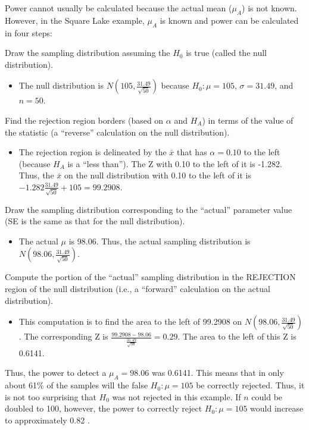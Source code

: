 \documentclass[10pt,openany]{book}\usepackage[]{graphicx}\usepackage[]{color}
\begin{document}
\vspace{12pt}
Power cannot usually be calculated because the actual mean ($\mu_{A}$) is not known.  However, in the Square Lake example, $\mu_{A}$ is known and power can be calculated in four steps:
\begin{Enumerate}
 \item Draw the sampling distribution assuming the $H_{0}$ is true (called the null distribution).
 \begin{itemize}
   \item The null distribution is $N(105,\frac{31.49}{\sqrt{50}})$ because $H_{0}:\mu=105$, $\sigma=31.49$, and $n=50$.
 \end{itemize}
 \item Find the rejection region borders (based on $\alpha$ and $H_{A}$) in terms of the value of the statistic (a ``reverse'' calculation on the null distribution).
 \begin{itemize}
   \item The rejection region is delineated by the $\bar{x}$ that has $\alpha=0.10$ to the left (because $H_{A}$ is a ``less than'').  The Z with 0.10 to the left of it is -1.282.  Thus, the $\bar{x}$ on the null distribution with 0.10 to the left of it is $-1.282\frac{31.49}{\sqrt{50}}+105 = 99.2908$.
 \end{itemize}
 \item Draw the sampling distribution corresponding to the ``actual'' parameter value (SE is the same as that for the null distribution).
 \begin{itemize}
   \item The actual $\mu$ is 98.06.  Thus, the actual sampling distribution is $N(98.06,\frac{31.49}{\sqrt{50}})$.
 \end{itemize}
 \item Compute the portion of the ``actual'' sampling distribution in the REJECTION region of the null distribution (i.e., a ``forward'' calculation on the actual distribution).
 \begin{itemize}
   \item This computation is to find the area to the left of 99.2908 on $N(98.06,\frac{31.49}{\sqrt{50}})$.  The corresponding Z is $\frac{99.2908-98.06}{\frac{31.49}{\sqrt{50}}}=0.29$.  The area to the left of this Z is 0.6141.
 \end{itemize}
\end{Enumerate}

Thus, the power to detect a $\mu_{A}=98.06$ was 0.6141.  This means that in only about 61\% of the samples will the false $H_{0}:\mu=105$ be correctly rejected.  Thus, it is not too surprising that $H_{0}$ was not rejected in this example.  If $n$ could be doubled to 100, however, the power to correctly reject $H_{0}:\mu=105$ would increase to approximately 0.82 .
\end{document}
